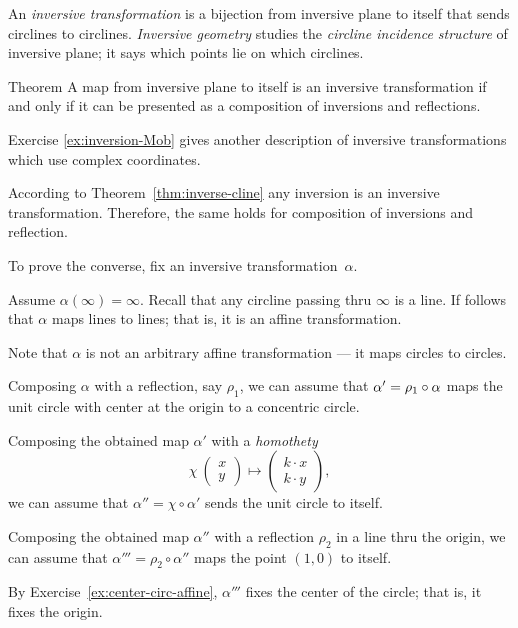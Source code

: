 An \emph{inversive transformation} is a bijection from inversive plane to itself that sends circlines to circlines.
\emph{Inversive geometry} studies the {}\emph{circline incidence structure} of inversive plane;
it says which points lie on which circlines.

\begin{thm}{Theorem}\label{thm:inversions-inversive}
A map from inversive plane to itself is an inversive transformation
if and only if it can be presented as a composition of inversions and reflections.  
\end{thm}

Exercise \ref{ex:inversion-Mob} gives another description of inversive transformations which use complex coordinates.

According to Theorem~\ref{thm:inverse-cline} any inversion is an inversive transformation.
Therefore, the same holds for composition of inversions and reflection.

To prove the converse, 
fix an inversive transformation~$\alpha$.

Assume $\alpha(\infty)=\infty$.
Recall that any circline passing thru $\infty$ is a line.
If follows that $\alpha$ maps lines to lines;
that is,
it is an affine transformation.

Note that $\alpha$ is not an arbitrary affine transformation --- it maps circles to circles.

Composing $\alpha$ with a reflection, say $\rho_1$, we can assume that $\alpha'\z=\rho_1\circ\alpha$ maps the unit circle with center at the origin to a concentric circle. 

Composing the obtained map $\alpha'$ with a {}\emph{homothety} 
\[\chi\:\left(\begin{smallmatrix}
x\\ y
\end{smallmatrix} \right)\mapsto \left(\begin{smallmatrix}
k\cdot x\\ k\cdot y
\end{smallmatrix} \right),\]
we can assume that $\alpha''=\chi\circ\alpha'$ sends the unit circle to itself.


Composing the obtained map $\alpha''$ with a reflection $\rho_2$ in a line thru the origin,
we can assume that $\alpha'''=\rho_2\circ\alpha''$ maps the point $(1,0)$ to itself.

By Exercise~\ref{ex:center-circ-affine},
$\alpha'''$ fixes the center of the circle;
that is, it fixes the origin.

